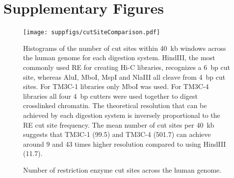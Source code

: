 \section*{Supplementary Figures}


\begin{figure}[ht!]
\begin{center}
\texttt{[image: suppfigs/cutSiteComparison.pdf]}
\end{center}
\caption{Number of restriction enzyme cut sites across the human genome.}
{Histograms of the number of cut sites within 40~kb windows across the human
    genome for each digestion system. HindIII, the most commonly used RE
    for creating Hi-C libraries, recognizes a 6~bp cut site, whereas AluI,
    MboI, MspI and NlaIII all cleave from 4~bp cut sites. For TM3C-1 libraries
    only MboI was used. For TM3C-4 libraries all four 4~bp cutters were used
    together to digest crosslinked chromatin. The theoretical resolution that can
    be achieved by each digestion system is inversely proportional to the
    RE cut site frequency. The mean number of cut sites per 40~kb suggests that
    TM3C-1 (99.5) and TM3C-4 (501.7) can achieve around 9 and 43 times
    higher resolution compared to using HindIII (11.7).
}
\label{suppfig:cutSiteComparison}
\end{figure}
\clearpage

